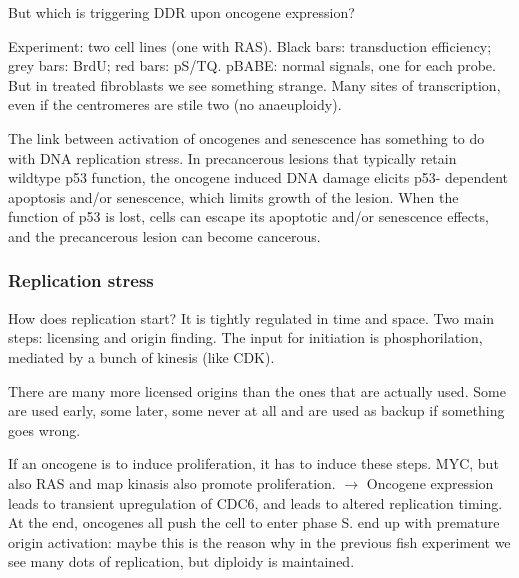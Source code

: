 But which is triggering DDR upon oncogene expression?

Experiment: two cell lines (one with RAS). Black bars: transduction
efficiency; grey bars: BrdU; red bars: pS/TQ.
pBABE: normal signals, one for each probe. But in treated fibroblasts we
see something strange. Many sites of transcription, even if the
centromeres are stile two (no anaeuploidy).

The link between activation of oncogenes and senescence has something to
do with DNA replication stress. In precancerous lesions that typically
retain wildtype p53 function, the oncogene induced DNA damage elicits
p53- dependent apoptosis and/or senescence, which limits growth of the
lesion. When the function of p53 is lost, cells can escape its apoptotic
and/or senescence effects, and the precancerous lesion can become
cancerous.

\hypertarget{replication-stress}{%
\subsubsection{Replication stress}\label{replication-stress}}

How does replication start? It is tightly regulated in time and space.
Two main steps: licensing and origin finding. The input for initiation
is phosphorilation, mediated by a bunch of kinesis (like CDK).

There are many more licensed origins than the ones that are actually
used. Some are used early, some later, some never at all and are used as
backup if something goes wrong.

If an oncogene is to induce proliferation, it has to induce these steps.
MYC, but also RAS and map kinasis also promote proliferation.
$\rightarrow$ Oncogene expression leads to transient upregulation of
CDC6, and leads to altered replication timing. At the end, oncogenes all
push the cell to enter phase S.
end up with premature origin activation: maybe this is the reason why in
the previous fish experiment we see many dots of replication, but
diploidy is maintained.

